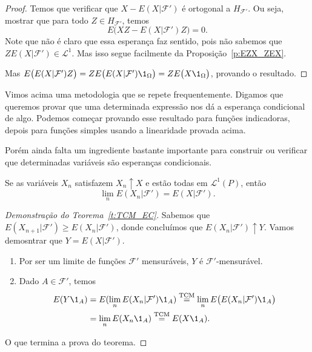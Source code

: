 \documentclass[../Notas_de_aula.tex]{subfiles}
\begin{document}
\begin{proof}
  Temos que verificar que $X - E(X|\mathcal{F}')$ é ortogonal a $H_{\mathcal{F}'}$.
  Ou seja, mostrar que para todo $Z \in H_{\mathcal{F}'}$, temos
  \begin{equation}
    E\big( XZ - E(X|\mathcal{F}') Z \big) = 0.
  \end{equation}
  Note que não é claro que essa esperança faz sentido, pois não sabemos que $ZE(X|\mathcal{F}') \in \mathcal{L}^1$.
  Mas isso segue facilmente da Proposição~\ref{p:EZX_ZEX}.

  Mas $E\big( E(X|\mathcal{F}') Z \big) = Z E\big( E(X | \mathcal{F}') \1_\Omega \big) = Z E\big( X \1_\Omega \big)$, provando o resultado.
\end{proof}

Vimos acima uma metodologia que se repete frequentemente.
Digamos que queremos provar que uma determinada expressão nos dá a esperança condicional de algo.
Podemos começar provando esse resultado para funções indicadoras, depois para funções simples usando a linearidade provada acima.

Porém ainda falta um ingrediente bastante importante para construir ou verificar que determinadas variáveis são esperanças condicionais.

\begin{theorem}
  \label{t:TCM_EC}
  Se as variáveis $X_n$ satisfazem $X_n \uparrow X$ e estão todas em $\mathcal{L}^1(P)$, então
  \begin{equation}
    \lim_n E(X_n|\mathcal{F}') = E(X|\mathcal{F}').
  \end{equation}
\end{theorem}

\begin{proof}[Demonstração do Teorema~\ref{t:TCM_EC}]
  Sabemos que $E(X_{n+1} | \mathcal{F}') \geq E(X_n|\mathcal{F}')$, donde concluímos que $E(X_n|\mathcal{F}') \uparrow Y$.
  Vamos demosntrar que $Y = E(X|\mathcal{F}')$.
  \begin{enumerate}[\quad a)]
  \item Por ser um limite de funções $\mathcal{F}'$ mensuráveis, $Y$ é $\mathcal{F}'$-mensurável.
  \item Dado $A \in \mathcal{F}'$, temos
    \begin{equation}
      \begin{split}
        E(Y \1_A) & = E(\lim_n E(X_n |\mathcal{F}') \1_A) \overset{\text{TCM}}= \lim_n E\big( E(X_n|\mathcal{F}') \1_A \big)\\
        & = \lim_n E(X_n \1_A) \overset{\text{TCM}}= E(X \1_A).
      \end{split}
    \end{equation}
  \end{enumerate}
  O que termina a prova do teorema.
\end{proof}
\end{document}
